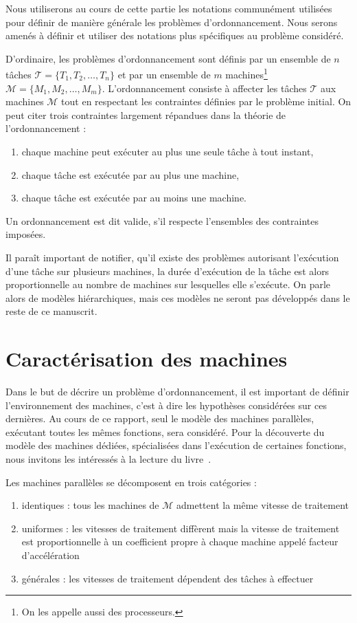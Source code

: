 \documentclass[a4paper,11pt]{report}
\begin{document}
Nous utiliserons au cours de cette partie les notations communément utilisées pour définir de
manière générale les problèmes d'ordonnancement. Nous serons amenés à définir et utiliser des
notations plus spécifiques au problème considéré.

D'ordinaire, les problèmes d'ordonnancement sont définis par un ensemble de $n$ tâches $\mathcal{T} =
\{T_1, T_2, \dots, T_n\}$ et par un ensemble de $m$ machines\footnote{On les appelle aussi des
processeurs.} $\mathcal{M} = \{M_1, M_2, \dots, M_m\}$. L'ordonnancement consiste à affecter les
tâches $\mathcal{T}$ aux machines $\mathcal{M}$ tout en respectant les contraintes définies par
le problème initial. On peut citer trois contraintes largement répandues dans la théorie de
l'ordonnancement :
\begin{enumerate}
    \item chaque machine peut exécuter au plus une seule tâche à tout instant,
    \item chaque tâche est exécutée par au plus une machine,
    \item chaque tâche est exécutée par au moins une machine.
\end{enumerate}
Un ordonnancement est dit valide, s'il respecte l'ensembles des contraintes imposées.

Il paraît important de notifier, qu'il existe des problèmes autorisant l'exécution d'une tâche sur
plusieurs machines, la durée d'exécution de la tâche est alors proportionnelle au nombre de
machines sur lesquelles elle s'exécute. On parle alors de modèles hiérarchiques, mais ces modèles
ne seront pas développés dans le reste de ce manuscrit.

\section{Caractérisation des machines}

Dans le but de décrire un problème d'ordonnancement, il est important de définir l'environnement des
machines, c'est à dire les hypothèses considérées sur ces dernières. Au cours de ce rapport, seul
le modèle des machines parallèles, exécutant toutes les mêmes fonctions, sera considéré. Pour la
découverte du modèle des machines dédiées, spécialisées dans l'exécution de certaines fonctions,
nous invitons les intéressés à la lecture du livre~\cite{blazewicz_handbook_2007}.

Les machines parallèles se décomposent en trois catégories :
\begin{enumerate}
    \item identiques : tous les machines de $\mathcal{M}$ admettent la même vitesse de traitement
    \item uniformes : les vitesses de traitement diffèrent mais la vitesse de traitement est
        proportionnelle à un coefficient propre à chaque machine appelé facteur d'accélération
    \item générales : les vitesses de traitement dépendent des tâches à effectuer
\end{enumerate}
\end{document}
